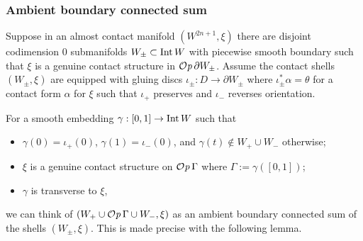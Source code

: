 \documentclass[12pt]{paper}
\theoremstyle{plain}
\theoremstyle{definition}
\newcommand{\p}{\partial}
\newcommand{\Int}{{\rm Int\,}} %
\def\Op{{\mathcal O}{\it p}\,}
\numberwithin{figure}{section}
\begin{document}
\subsubsection{Ambient boundary connected sum}
	Suppose in an almost contact manifold $(W^{2n+1}, \xi)$ there are disjoint codimension $0$ submanifolds 
	$W_\pm \subset \Int W$ with piecewise smooth boundary such that $\xi$ is a genuine contact structure in $\Op \p W_\pm$.
	Assume the contact shells $(W_\pm, \xi)$ are equipped with gluing discs
	$\iota_\pm: D \to \p W_\pm$
	where $\iota_{\pm}^* \alpha = \theta$ for a contact form $\alpha$ for $\xi$ such that
	$\iota_+$ preserves and $\iota_-$ reverses orientation.  
	
	For a smooth embedding	
		$\gamma: [0,1] \to \Int W$
		such that 
		\begin{itemize}
		\item   $\gamma(0) = \iota_+(0)$, $\gamma(1) = \iota_-(0)$, 
		and  $\gamma(t) \notin W_+ \cup W_-$ otherwise;
	\item $\xi$ is a genuine contact structure on $\Op \Gamma$ where $\Gamma:=\gamma([0,1])$;
	\item $\gamma$ is transverse to $\xi$,
	\end{itemize}
	we can think of $(W_+ \cup \Op \Gamma \cup W_-, \xi)$ as an ambient boundary connected sum of
	the shells $(W_\pm, \xi)$.  This is made precise with the following lemma.
	
\end{document}
